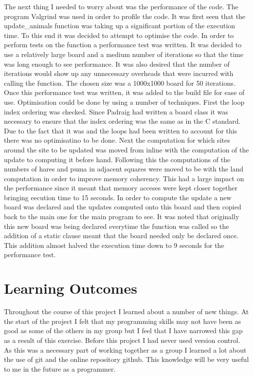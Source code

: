 \documentclass[12pt]{article}    %
\numberwithin{equation}{section}
\begin{document}
The next thing I needed to worry about was the performance of the code.
The program Valgrind was used in order to profile the code.
It was first seen that the update\_animals function was taking up a significant portion of the execution time.
To this end it was decided to attempt to optimise the code.
In order to perform tests on the function a performance test was written.
It was decided to use a relatively large board and a medium number of iterations so that the time was long enough to see performance.
It was also desired that the number of iterations would show up any unnecessary overheads that were incurred with calling the function.
The chosen size was a 1000x1000 board for 50 iterations.
Once this performance test was written, it was added to the build file for ease of use.
Optimisation could be done by using a number of techniques.
First the loop index ordering was checked.
Since Padraig had written a board class it was necessary to ensure that the index ordering was the same as in the C standard.
Due to the fact that it was and the loops had been written to account for this there was no optimisatino to be done.
Next the computation for which sites around the site to be updated was moved from inline with the computation of the update to computing it before hand.
Following this the computations of the numbers of hares and puma in adjacent squares were moved to be with the land computation in order to improve memory coherency.
This had a large impact on the performance since it meant that memory acceses were kept closer together bringing eecution time to 15 seconds.
In order to compute the update a new board was declared and the updates computed onto this board and then copied back to the main one for the main program to see.
It was noted that originally this new board was being declared everytime the function was called so the addition of a static clause meant that the board needed only be declared once.
This addition almost halved the execution time down to 9 seconds for the performance test.

\section{Learning Outcomes}
Throughout the course of this project I learned about a number of new things.
At the start of the project I felt that my programming skills may not have been as good as some of the others in my group but I feel that I have narrowed this gap as a result of this exercise.
Before this project I had never used version control.
As this was a necessary part of working together as a group I learned a lot about the use of git and the online repository github.
This knowledge will be very useful to me in the future as a programmer.
\end{document}
